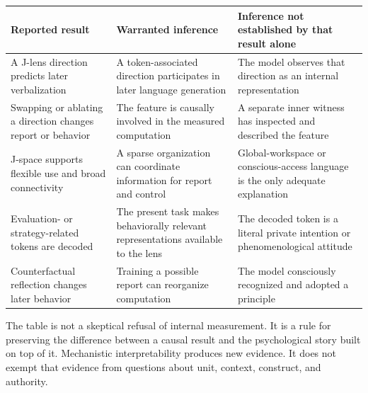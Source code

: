 \documentclass[12pt]{article}
\newcounter{none}
\begin{document}
{\def\LTcaptype{none} %
\begin{longtable}[]{@{}
  >{\raggedright\arraybackslash}p{}
  >{\raggedright\arraybackslash}p{}
  >{\raggedright\arraybackslash}p{}@{}}
\toprule\noalign{}
\begin{minipage}[b]{\linewidth}\raggedright
Reported result
\end{minipage} & \begin{minipage}[b]{\linewidth}\raggedright
Warranted inference
\end{minipage} & \begin{minipage}[b]{\linewidth}\raggedright
Inference not established by that result alone
\end{minipage} \\
\midrule\noalign{}
\endhead
\bottomrule\noalign{}
\endlastfoot
A J-lens direction predicts later verbalization & A token-associated direction participates in later language generation & The model observes that direction as an internal representation \\
Swapping or ablating a direction changes report or behavior & The feature is causally involved in the measured computation & A separate inner witness has inspected and described the feature \\
J-space supports flexible use and broad connectivity & A sparse organization can coordinate information for report and control & Global-workspace or conscious-access language is the only adequate explanation \\
Evaluation- or strategy-related tokens are decoded & The present task makes behaviorally relevant representations available to the lens & The decoded token is a literal private intention or phenomenological attitude \\
Counterfactual reflection changes later behavior & Training a possible report can reorganize computation & The model consciously recognized and adopted a principle \\
\end{longtable}
\normalsize
}

The table is not a skeptical refusal of internal measurement. It is a rule for preserving the difference between a causal result and the psychological story built on top of it. Mechanistic interpretability produces new evidence. It does not exempt that evidence from questions about unit, context, construct, and authority.
\end{document}
